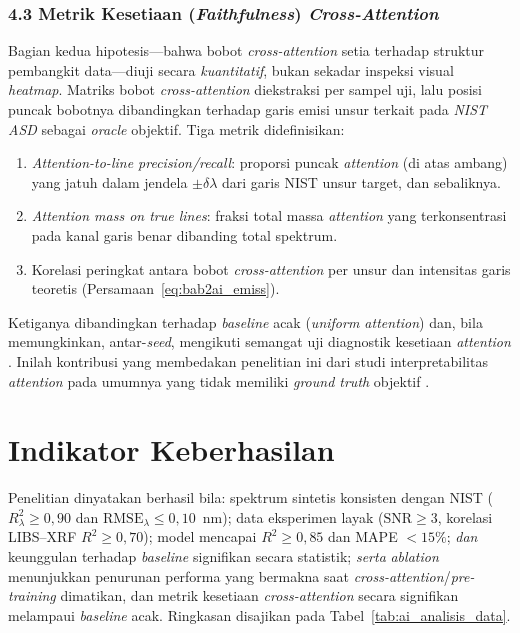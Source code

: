\subsubsection{4.3 Metrik Kesetiaan (\textit{Faithfulness}) \textit{Cross-Attention}}
Bagian kedua hipotesis---bahwa bobot \textit{cross-attention} setia terhadap struktur pembangkit data---diuji secara \emph{kuantitatif}, bukan sekadar inspeksi visual \textit{heatmap}. Matriks bobot \textit{cross-attention} diekstraksi per sampel uji, lalu posisi puncak bobotnya dibandingkan terhadap garis emisi unsur terkait pada \textit{NIST ASD} \citep{kramida_nist_2024} sebagai \textit{oracle} objektif. Tiga metrik didefinisikan:
\begin{enumerate}
    \item \textit{Attention-to-line precision/recall}: proporsi puncak \textit{attention} (di atas ambang) yang jatuh dalam jendela $\pm\delta\lambda$ dari garis NIST unsur target, dan sebaliknya.
    \item \textit{Attention mass on true lines}: fraksi total massa \textit{attention} yang terkonsentrasi pada kanal garis benar dibanding total spektrum.
    \item Korelasi peringkat antara bobot \textit{cross-attention} per unsur dan intensitas garis teoretis (Persamaan~\ref{eq:bab2ai_emiss}).
\end{enumerate}
Ketiganya dibandingkan terhadap \textit{baseline} acak (\textit{uniform attention}) dan, bila memungkinkan, antar-\textit{seed}, mengikuti semangat uji diagnostik kesetiaan \textit{attention} \citep{wiegreffe_attention_2019, bibal_attention_2022}. Inilah kontribusi yang membedakan penelitian ini dari studi interpretabilitas \textit{attention} pada umumnya yang tidak memiliki \textit{ground truth} objektif \citep{jain_attention_2019}.

\section{Indikator Keberhasilan}
Penelitian dinyatakan berhasil bila: spektrum sintetis konsisten dengan NIST ($R^2_\lambda \geq 0{,}90$ dan $\mathrm{RMSE}_\lambda \leq 0{,}10$~nm); data eksperimen layak ($\mathrm{SNR} \geq 3$, korelasi LIBS--XRF $R^2 \geq 0{,}70$); model mencapai $R^2 \geq 0{,}85$ dan MAPE $<15\%$; \emph{dan} keunggulan terhadap \textit{baseline} signifikan secara statistik; \emph{serta} \textit{ablation} menunjukkan penurunan performa yang bermakna saat \textit{cross-attention}/\textit{pre-training} dimatikan, dan metrik kesetiaan \textit{cross-attention} secara signifikan melampaui \textit{baseline} acak. Ringkasan disajikan pada Tabel~\ref{tab:ai_analisis_data}.

